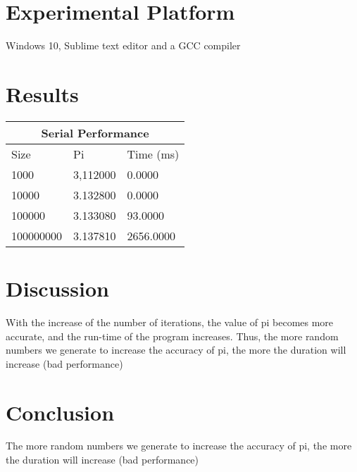 \documentclass[10pt,a4paper]{article} %
\begin{document}
\section{Experimental Platform}
Windows 10, Sublime text editor and a GCC compiler

\section{Results}
\begin{tabular}{ |p{2cm}||p{2cm}|p{2cm}|  }
 \hline
 \multicolumn{3}{|c|}{Serial Performance} \\
 \hline
 Size& Pi&Time (ms)\\
 \hline
 1000   & 3,112000    &0.0000\\
 10000&   3.132800  & 0.0000\\
 100000& 3.133080 & 93.0000\\
 100000000    &3.137810 & 2656.0000\\
 \hline
\end{tabular}

\section{Discussion}

With the increase of the number of iterations, the value
of pi becomes more accurate, and the run-time of the program increases. Thus, the more random numbers we generate to increase the accuracy of pi, the more the duration will
increase (bad performance)


\section{Conclusion}
The more random numbers we generate to increase the accuracy of pi, the more the duration will
increase (bad performance)

\end{document}
